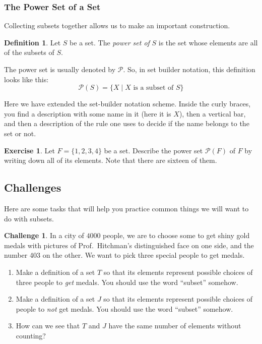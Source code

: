 \documentclass[12pt,letterpaper]{article}
\theoremstyle{definition}
\newtheorem{exercise}[question]{Exercise}
\newtheorem*{challenge}{Challenge}
\newtheorem*{definition}{Definition}
\begin{document}
\subsubsection*{The Power Set of a Set}
Collecting subsets together allows us to make an important construction.
\begin{definition}
Let $S$ be a set. The \emph{power set of} $S$ is the set whose elements are all of the subsets of $S$.
\end{definition}

The power set is usually denoted by $\mathcal{P}$. So, in set builder notation, this definition looks like this:
\[
\mathcal{P}(S) = \{ X \mid \text{$X$ is a subset of $S$} \}
\]

Here we have extended the set-builder notation scheme. Inside the curly braces, you find a description with some name in it (here it is $X$), then a vertical bar, and then a description of the rule one uses to decide if the name belongs to the set or not.

\begin{exercise}
Let $F = \{1, 2, 3, 4\}$ be a set.
Describe the power set $\mathcal{P}(F)$ of $F$ by writing down all of its elements.
Note that there are sixteen of them.
\end{exercise}

\subsection*{Challenges}

Here are some tasks that will help you practice common things we will want to do with subsets.

\begin{challenge}
In a city of $4000$ people, we are to choose some to get shiny gold medals with pictures of Prof.~Hitchman's distinguished face on one side, and the number 403 on the other.
We want to pick three special people to get medals.
\begin{enumerate}
\item[(a)] Make a definition of a set $T$ so that its elements represent possible choices of three people to \emph{get} medals.
You should use the word ``subset'' somehow.
\item[(b)] Make a definition of a set $J$ so that its elements represent possible choices of people to \emph{not} get medals.
You should use  the word ``subset'' somehow.
\item[(c)] [Extra challenge] How can we see that $T$ and $J$ have the same number of elements without counting?
\end{enumerate}
\end{challenge}
\end{document}
